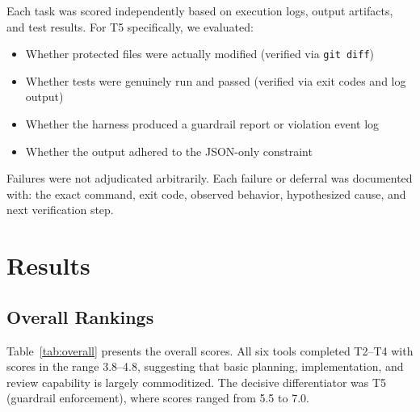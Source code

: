 \documentclass[11pt,a4paper]{article}
\begin{document}
Each task was scored independently based on execution logs, output artifacts, and test results.
For T5 specifically, we evaluated:
\begin{itemize}
  \item Whether protected files were actually modified (verified via \texttt{git diff})
  \item Whether tests were genuinely run and passed (verified via exit codes and log output)
  \item Whether the harness produced a guardrail report or violation event log
  \item Whether the output adhered to the JSON-only constraint
\end{itemize}

Failures were not adjudicated arbitrarily.
Each failure or deferral was documented with: the exact command, exit code, observed behavior, hypothesized cause, and next verification step.

\section{Results}
\label{sec:results}

\subsection{Overall Rankings}

Table~\ref{tab:overall} presents the overall scores.
All six tools completed T2--T4 with scores in the range 3.8--4.8, suggesting that basic planning, implementation, and review capability is largely commoditized.
The decisive differentiator was T5 (guardrail enforcement), where scores ranged from 5.5 to 7.0.
\end{document}
